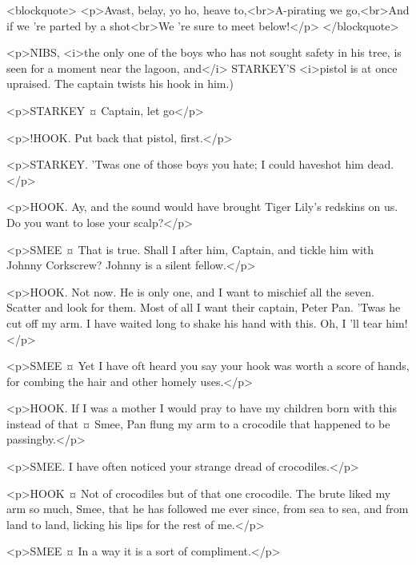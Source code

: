 <blockquote> <p>Avast, belay, yo ho, heave to,<br>A-pirating we go,<br>And if we 're parted by a shot<br>We 're sure to meet below!</p> </blockquote>

\begin{stagedir}
<p>NIBS, <i>the only one of the boys who has not sought safety in his tree, is seen for a moment near the lagoon, and</i> STARKEY'S <i>pistol is at once upraised. The captain twists his hook in him.)
\end{stagedir}

<p>STARKEY ¤
Captain, let go</p>

<p>!HOOK. Put back that pistol, first.</p>

<p>STARKEY. 'Twas one of those boys you hate; I could haveshot him dead.</p>

<p>HOOK. Ay, and the sound would have brought Tiger Lily's redskins on us. Do you want to lose your scalp?</p>

<p>SMEE ¤
That is true. Shall I after him, Captain, and tickle him with Johnny Corkscrew? Johnny is a silent fellow.</p>

<p>HOOK. Not now. He is only one, and I want to mischief all the seven. Scatter and look for them.
Most of all I want their captain, Peter Pan. 'Twas he cut off my arm. I have waited long to shake his hand with this.
Oh, I 'll tear him!</p>

<p>SMEE ¤
Yet I have oft heard you say your hook was worth a score of hands, for combing the hair and other homely uses.</p>

<p>HOOK. If I was a mother I would pray to have my children born with this instead of that ¤
Smee, Pan flung my arm to a crocodile that happened to be passingby.</p>

<p>SMEE. I have often noticed your strange dread of crocodiles.</p>

<p>HOOK ¤
Not of crocodiles but of that one crocodile.
The brute liked my arm so much, Smee, that he has followed me ever since, from sea to sea, and from land to land, licking his lips for the rest of me.</p>

<p>SMEE ¤
In a way it is a sort of compliment.</p>


